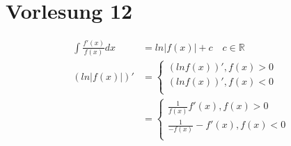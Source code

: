 \section{Vorlesung 12}
\begin{align*}
\int \frac{f'(x)}{f(x)}dx &= ln |f(x)| + c \quad c \in \mathbb{R} \\
( ln | f(x)| )'   &= 
\begin{cases} 
(ln f(x))' , f(x)> 0 \\
(ln f(x))' , f(x)< 0 \\ 
\end{cases}\\
&=
\begin{cases}
\frac{1}{f(x)}f'(x),f(x) >0 \\
\frac{1}{-f(x)}-f'(x),f(x) < 0\\
\end{cases} \\
\end{align*}
